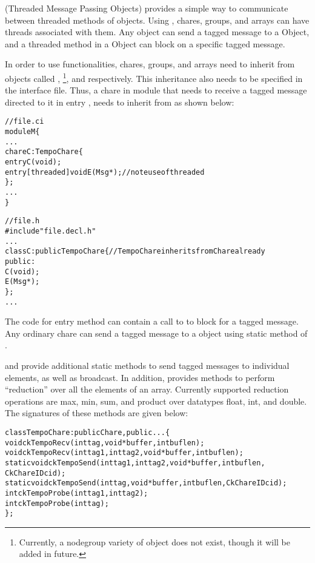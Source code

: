 \tempo{} (Threaded Message Passing Objects) provides a simple way
to communicate between threaded methods of objects. Using \tempo{},
chares, groups, and arrays can have threads associated with
them. Any \charmpp{} object can send a tagged message to a \tempo{} Object,
and a threaded method in a \tempo{} Object can block on a specific tagged
message.

In order to use \tempo{} functionalities, chares, groups, and arrays need
to inherit from \tempo{} objects called , 
\footnote{Currently, a nodegroup variety of \tempo{} object does not exist, 
though it will be added in future.},
and  respectively. This inheritance also needs to be
specified in the \charmpp{} interface file. Thus, a chare  in module
 that needs to receive a tagged message directed to it in entry , 
needs to inherit from  as shown below:

\begin{alltt}
// file.ci
module M \{
 ...
 chare C : TempoChare \{
   entry C(void);
   entry [threaded] void E(Msg *); // note use of threaded
 \};
 ...
\}

// file.h
#include "file.decl.h"
...
class C : public TempoChare \{ // TempoChare inherits from Chare already
 public:
  C(void);
  E(Msg *);
\};
...
\end{alltt}

The code for entry method  can contain a call to 
to block for a tagged message. Any ordinary chare can send a tagged
message to a \tempo{} object using  static method of 
.

 and  provide additional static methods to
send tagged messages to individual elements, as well as broadcast. In
addition,  provides methods to perform ``reduction''
over all the elements of an array. Currently supported reduction operations
are max, min, sum, and product over datatypes float, int, and double.
The signatures of these methods are given below:

\begin{alltt}
class TempoChare : public Chare, public ... \{
  void ckTempoRecv(int tag, void *buffer, int buflen);
  void ckTempoRecv(int tag1, int tag2, void *buffer, int buflen);
  static void ckTempoSend(int tag1, int tag2, void *buffer,int buflen,
                          CkChareID cid);
  static void ckTempoSend(int tag, void *buffer,int buflen, CkChareID cid);
  int ckTempoProbe(int tag1, int tag2);
  int ckTempoProbe(int tag);
\};
\end{alltt}

